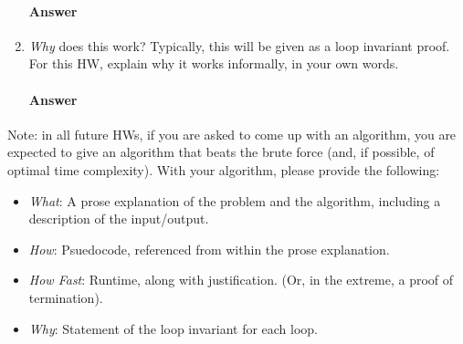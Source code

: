 \documentclass{article}
\begin{document}
\begin{enumerate}
        \paragraph{Answer}
        \todo{}

    \item \emph{Why} does this work? Typically, this will be given as a loop
        invariant proof.  For this HW, explain why it works informally, in your
        own words.

        \paragraph{Answer}
        \todo{}

\end{enumerate}

Note: in all future HWs, if you are asked to come up with an algorithm, you are
expected to give an algorithm that beats the brute force (and, if possible, of
optimal time complexity). With your algorithm, please provide the following:
\begin{itemize}
    \item \emph{What}: A prose explanation of the problem and the algorithm,
        including a description of the input/output.
    \item \emph{How}: Psuedocode, referenced from within the prose explanation.
    \item \emph{How Fast}: Runtime, along with justification.  (Or, in the
        extreme, a proof of termination).
    \item \emph{Why}: Statement of the loop invariant for each loop.
\end{itemize}
\end{document}

